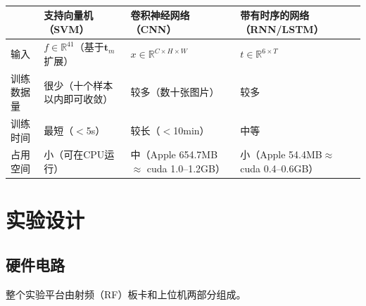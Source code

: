 \begin{table}[htbp]
    \centering
    \caption{}
    \label{tab:method_compare}
    {\setlength{\extrarowheight}{2pt}%
    \begin{tabularx}{\linewidth}{|>{\centering\arraybackslash}p{2.2cm}|>{\centering\arraybackslash}X|>{\centering\arraybackslash}X|>{\centering\arraybackslash}X|}
        \hline
         & \textbf{支持向量机（SVM）} & \textbf{卷积神经网络（CNN）} & \textbf{带有时序的网络（RNN/LSTM）} \\
        \hline
        输入 & $f \in \mathbb{R}^{41}$（基于$\boldsymbol{t}_{m}$扩展） & $x \in \mathbb{R}^{C \times H \times W}$ & $t \in \mathbb{R}^{6 \times T}$ \\
        \hline
        训练数据量 & 很少（十个样本以内即可收敛） & 较多（数十张图片） & 较多 \\
        \hline
        训练时间 & 最短（$<$5s） & 较长（$<$10min） & 中等 \\
        \hline
        占用空间 & 小\newline（可在CPU运行） & 中\newline（Apple 654.7MB\newline $\approx$ cuda 1.0--1.2GB） & 小\newline（Apple 54.4MB\newline $\approx$ cuda 0.4--0.6GB） \\
        \hline
    \end{tabularx}}
\end{table}

\section{实验设计}

\subsection{硬件电路}

整个实验平台由射频（RF）板卡和上位机两部分组成。

